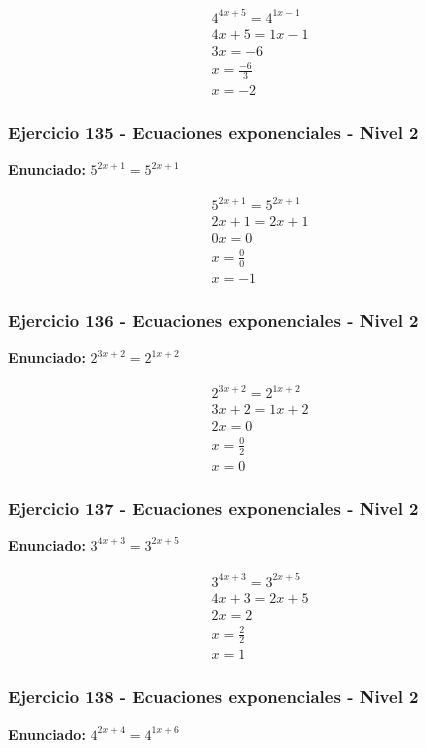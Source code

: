 \documentclass[12pt,a4paper]{article}
\begin{document}
\[
\begin{aligned}
4^{4x+5}=4^{1x-1}\\
4x+5=1x-1\\
3x=-6\\
x=\frac{-6}{3}\\
\boxed{x=-2}
\end{aligned}
\]


\subsubsection*{Ejercicio 135 - Ecuaciones exponenciales - Nivel 2}
\textbf{Enunciado:} \(5^{2x+1}=5^{2x+1}\)

\[
\begin{aligned}
5^{2x+1}=5^{2x+1}\\
2x+1=2x+1\\
0x=0\\
x=\frac{0}{0}\\
\boxed{x=-1}
\end{aligned}
\]


\subsubsection*{Ejercicio 136 - Ecuaciones exponenciales - Nivel 2}
\textbf{Enunciado:} \(2^{3x+2}=2^{1x+2}\)

\[
\begin{aligned}
2^{3x+2}=2^{1x+2}\\
3x+2=1x+2\\
2x=0\\
x=\frac{0}{2}\\
\boxed{x=0}
\end{aligned}
\]


\subsubsection*{Ejercicio 137 - Ecuaciones exponenciales - Nivel 2}
\textbf{Enunciado:} \(3^{4x+3}=3^{2x+5}\)

\[
\begin{aligned}
3^{4x+3}=3^{2x+5}\\
4x+3=2x+5\\
2x=2\\
x=\frac{2}{2}\\
\boxed{x=1}
\end{aligned}
\]


\subsubsection*{Ejercicio 138 - Ecuaciones exponenciales - Nivel 2}
\textbf{Enunciado:} \(4^{2x+4}=4^{1x+6}\)
\end{document}
